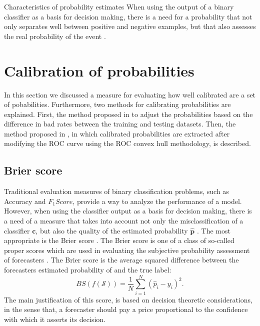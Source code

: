 \begin{remark}{Characteristics of probability estimates}
When using the output of a binary classifier as a basis for decision making, there is a 
need for a probability that not only separates well between positive and negative examples, but that 
also assesses the real probability of the event \citep{cohen2004}.
\end{remark}


\section{Calibration of probabilities}
\label{sec:5:prob}

In this section we discussed a measure for evaluating how well calibrated are a set of 
pobabilities. Furthermore, two methods for calibrating probabilities are explained. First, the 
method proposed in \citep{Elkan2001} to adjust the probabilities based on the   difference in bad 
rates  between the training and testing datasets.  Then, the method proposed in 
\cite{Hernandez-Orallo2012}, in which calibrated probabilities are extracted after modifying the ROC 
curve using the ROC convex hull methodology, is described.
  
  
\subsection{Brier score}

Traditional evaluation measures of binary classification problems, such as Accuracy and 
$F_1Score$, provide a way to analyze the performance of a model. However, when using the classifier 
output as a basis for decision making, there is a need of a measure that takes into account not only 
the misclassification of a classifier $\mathbf{c}$, but also the quality of the estimated 
probability $\mathbf{\hat p}$ \citep{cohen2004}. The most appropriate  is the Brier score 
\citep{brier1950}. The Brier score is one of a class of so-called proper scores which are used in 
evaluating the subjective probability assessment of forecasters \citep{DeGroot1983}. The Brier score 
is the average squared difference between the forecasters estimated probability of and the true 
label:
\begin{equation}
  BS(f(\mathcal{S})) = \frac{1}{N} \sum_{i=1}^{N} (\hat p_i - y_i)^2.
\end{equation}
The main justification of this score, is based on decision theoretic considerations, in the sense 
that, a forecaster should pay a price proportional to the confidence with which it asserts its 
decision.


